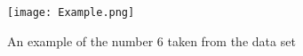 \begin{figure}[h]
\texttt{[image: Example.png]}
\caption{An example of the number 6 taken from the data set}
\end{figure}




















































